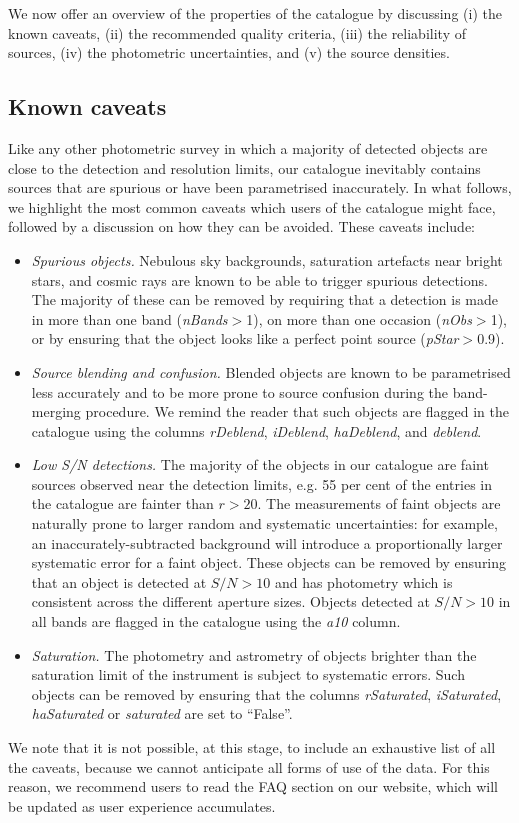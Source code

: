 \documentclass[a4paper,useAMS,usenatbib]{mn2e}
\begin{document}
{\bf

We now offer an overview of the properties of the
catalogue by discussing 
(i) the known caveats,
(ii) the recommended quality criteria,
(iii) the reliability of sources,
(iv) the photometric uncertainties,
and (v) the source densities.

\subsection{Known caveats}

Like any other photometric survey
in which a majority of detected objects are close
to the detection and resolution limits,
our catalogue inevitably contains sources
that are spurious or have been parametrised inaccurately.
In what follows, we highlight the most common
caveats which users of the catalogue might face,
followed by a discussion on how they can be avoided.
These caveats include:
\begin{itemize}
\item \emph{Spurious objects.}
Nebulous sky backgrounds,
saturation artefacts near bright stars,
and cosmic rays
are known to be able to trigger spurious detections.
The majority of these can be removed by requiring
that a detection is made in more than one band
(\emph{nBands}$>$1),
on more than one occasion (\emph{nObs}$>$1),
or by ensuring that the object looks like a perfect
point source (\emph{pStar}$>$0.9).
\item \emph{Source blending and confusion.}
Blended objects are known to be parametrised less accurately
and to be more prone 
to source confusion
during the band-merging procedure.
We remind the reader that such objects are flagged in the catalogue
using the columns \emph{rDeblend}, \emph{iDeblend},
\emph{haDeblend}, and \emph{deblend}.
\item \emph{Low S/N detections.}
The majority of the objects in our catalogue
are faint sources observed near the detection limits,
e.g. 55 per cent of the entries in the catalogue
are fainter than $r > 20$.
The measurements of faint objects
are naturally prone to larger
random and systematic uncertainties:
for example, an inaccurately-subtracted background
will introduce a proportionally larger systematic error
for a faint object.
These objects can be removed by ensuring that an
object is detected at $S/N>10$
and has photometry which is consistent across
the different aperture sizes.
Objects detected at $S/N>10$ in all bands
are flagged in the catalogue using the \emph{a10} column.
\item \emph{Saturation.}
The photometry and astrometry of objects
brighter than the saturation limit of the instrument
is subject to systematic errors.
Such objects can be removed by ensuring that the columns
\emph{rSaturated}, \emph{iSaturated}, \emph{haSaturated}
or \emph{saturated} are set to ``False''.
\end{itemize}
We note that it is not possible, at this stage,
to include an exhaustive list of all the caveats,
because we cannot anticipate all forms of use of the data.
For this reason, we recommend users to read
the FAQ section on our website,
which will be updated as user experience accumulates.


}
\end{document}
